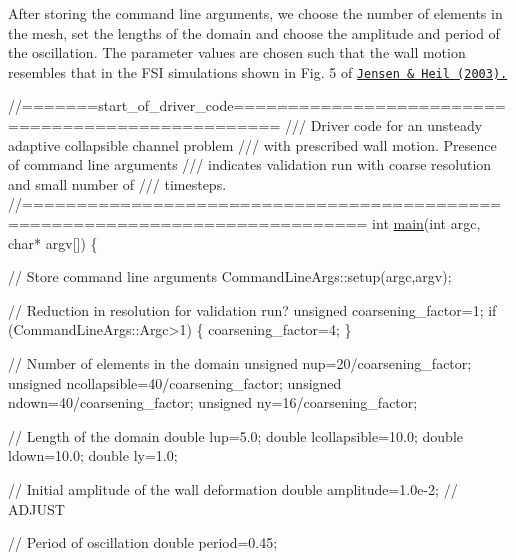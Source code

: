 After storing the command line arguments, we choose the number of elements in the mesh, set the lengths of the domain and choose the amplitude and period of the oscillation. The parameter values are chosen such that the wall motion resembles that in the F\+SI simulations shown in Fig. 5 of \href{http://www.maths.man.ac.uk/~mheil/MATTHIAS/PDF/JensenHeil2003.pdf}{\tt Jensen \& Heil (2003).}


\begin{DoxyCodeInclude}
\textcolor{comment}{//=======start\_of\_driver\_code==================================================}
\textcolor{comment}{/// Driver code for an unsteady adaptive collapsible channel problem}
\textcolor{comment}{}\textcolor{comment}{/// with prescribed wall motion. Presence of command line arguments}
\textcolor{comment}{}\textcolor{comment}{/// indicates validation run with coarse resolution and small number of}
\textcolor{comment}{}\textcolor{comment}{/// timesteps.}
\textcolor{comment}{}\textcolor{comment}{//=============================================================================}
\textcolor{keywordtype}{int} \hyperlink{collapsible__channel_8cc_a0ddf1224851353fc92bfbff6f499fa97}{main}(\textcolor{keywordtype}{int} argc, \textcolor{keywordtype}{char}* argv[])
\{

 \textcolor{comment}{// Store command line arguments}
 CommandLineArgs::setup(argc,argv);
  
 \textcolor{comment}{// Reduction in resolution for validation run?}
 \textcolor{keywordtype}{unsigned} coarsening\_factor=1;
 \textcolor{keywordflow}{if} (CommandLineArgs::Argc>1)
  \{
   coarsening\_factor=4;
  \}

 \textcolor{comment}{// Number of elements in the domain}
 \textcolor{keywordtype}{unsigned} nup=20/coarsening\_factor;
 \textcolor{keywordtype}{unsigned} ncollapsible=40/coarsening\_factor;
 \textcolor{keywordtype}{unsigned} ndown=40/coarsening\_factor;
 \textcolor{keywordtype}{unsigned} ny=16/coarsening\_factor;

 \textcolor{comment}{// Length of the domain}
 \textcolor{keywordtype}{double} lup=5.0;
 \textcolor{keywordtype}{double} lcollapsible=10.0;
 \textcolor{keywordtype}{double} ldown=10.0;
 \textcolor{keywordtype}{double} ly=1.0;

 \textcolor{comment}{// Initial amplitude of the wall deformation}
 \textcolor{keywordtype}{double} amplitude=1.0e-2; \textcolor{comment}{// ADJUST }
  
 \textcolor{comment}{// Period of oscillation}
 \textcolor{keywordtype}{double} period=0.45;

\end{DoxyCodeInclude}


